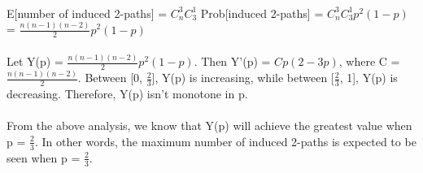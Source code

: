\begin{problem}{2} ~\\
E[number of induced 2-paths] = $C_n^3 C_3^1$ Prob[induced 2-paths] = $C_n^3 C_3^1 p^2 (1-p)$ = $\frac{n(n-1)(n-2)}{2} p^2 (1-p)$\\
\\
Let Y(p) = $\frac{n(n-1)(n-2)}{2} p^2 (1-p)$. Then Y'(p) = $C p(2-3p)$, where C = $\frac{n(n-1)(n-2)}{2}$. Between [0, $\frac{2}{3}$], Y(p) is increasing, while between [$\frac{2}{3}$, 1], Y(p) is decreasing. Therefore, Y(p) isn't monotone in p.\\
\\
From the above analysis, we know that Y(p) will achieve the greatest value when p = $\frac{2}{3}$. In other words, the maximum number of induced 2-paths is expected to be seen when p = $\frac{2}{3}$.
\end{problem}